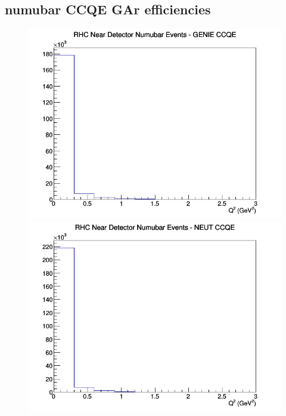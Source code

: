 \documentclass[12pt]{article}
\begin{document}
\subsection{numubar CCQE GAr efficiencies}
\begin{figure}[h]
\includegraphics[width=\linewidth]{eff_Q2/GAr/CCQE_RHC_ND_numubar_Q2_GENIE.png}
\endminipage
{}
\includegraphics[width=\linewidth]{eff_Q2/GAr/CCQE_RHC_ND_numubar_Q2_NEUT.png}
\endminipage
{}

\end{figure}
\end{document}
